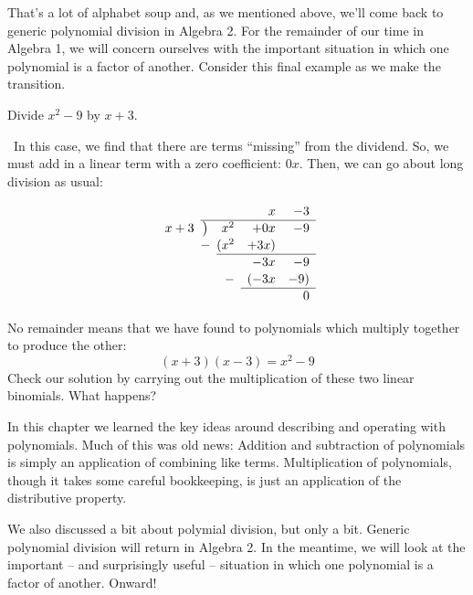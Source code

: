 That's a lot of alphabet soup and, as we mentioned above, we'll come back to generic polynomial division in Algebra 2. For the remainder of our time in Algebra 1, we will concern ourselves with the important situation in which one polynomial is a factor of another. Consider this final example as we make the transition.

\begin{boxex}
Divide $x^2-9$ by $x+3$.

\exsoln\ In this case, we find that there are terms ``missing'' from the dividend. So, we must add in a linear term with a zero coefficient: $0x$. Then, we can go about long division as usual:

\[
\renewcommand\arraystretch{1.1}
\begin{array}{*1r @{\hskip\arraycolsep}c@{\hskip\arraycolsep} *3r}
		&	~	&&x&-3\\
\cline{2-5}
x+3	&\big)	&x^2&+0x&-9\\
		&-		&(x^2&+3x)\\
\cline{3-5}
		&		&&-3x&-9\\
		&		&-&(-3x&-9)\\
\cline{4-5}
		&		&&&0
\end{array}
\]

No remainder means that we have found to polynomials which multiply together to produce the other:
\[(x+3)(x-3) = x^2 - 9\]
Check our solution by carrying out the multiplication of these two linear binomials. What happens?
\end{boxex}

\chaptersummary

In this chapter we learned the key ideas around describing and operating with polynomials. Much of this was old news: Addition and subtraction of polynomials is simply an application of combining like terms. Multiplication of polynomials, though it takes some careful bookkeeping, is just an application of the distributive property.

We also discussed a bit about polymial division, but only a bit. Generic polynomial division will return in Algebra 2. In the meantime, we will look at the important -- and surprisingly useful -- situation in which one polynomial is a factor of another. Onward!
